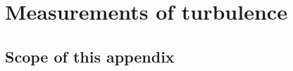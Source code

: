 \documentclass[12pt,twoside,english]{article}\usepackage[]{graphicx}\usepackage[]{color}
\let\stdsection\section
\renewcommand{\section}{\newpage\stdsection}
\begin{document}
{{%

% 
% 
% 
% 
% 
% 







\section{Measurements of turbulence\label{sec:turbulence}}

\subsection{Scope of this appendix}

}}
\end{document}
